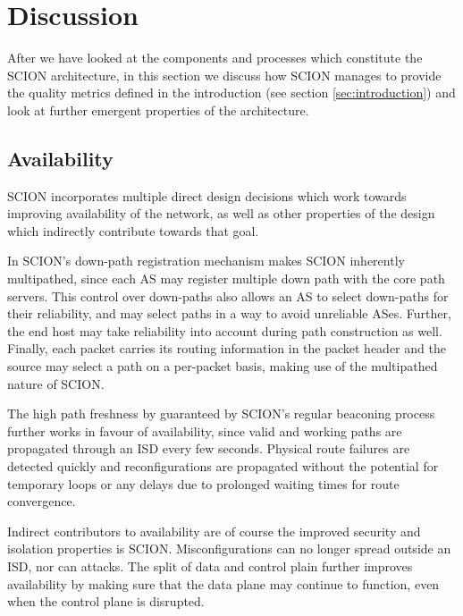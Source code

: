 \documentclass[../eva1_scion.tex]{subfiles}
\begin{document}
   \section{Discussion}\label{sec:discussion}
  After we have looked at the components and processes which constitute the SCION architecture, in this section we discuss how SCION manages to provide the quality metrics defined in the introduction (see section \ref{sec:introduction}) and look at further emergent properties of the architecture.

    \subsection{Availability}
    SCION incorporates multiple direct design decisions which work towards improving availability of the network, as well as other properties of the design which indirectly contribute towards that goal.

    In SCION's down-path registration mechanism makes SCION inherently multipathed, since each AS may register multiple down path with the core path servers. This control over down-paths also allows an AS to select down-paths for their reliability, and may select paths in a way to avoid unreliable ASes. Further,  the end host may take reliability into account during path construction as well. Finally, each packet carries its routing information in the packet header and the source may select a path on a per-packet basis, making use of the multipathed nature of SCION.

    The high path freshness by guaranteed by SCION's regular beaconing process further works in favour of availability, since valid and working paths are propagated through an ISD every few seconds. Physical route failures are detected quickly and reconfigurations are propagated without the potential for temporary loops or any delays due to prolonged waiting times for route convergence.

    Indirect contributors to availability are of course the improved security and isolation properties is SCION. Misconfigurations can no longer spread outside an ISD, nor can attacks. The split of data and control plain further improves availability by making sure that the data plane may continue to function, even when the control plane is disrupted.
\end{document}
